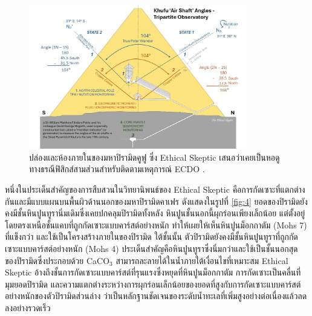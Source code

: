 \documentclass[10pt,twocolumn,letterpaper]{article}
\begin{document}
\begin{figure}[b]
\begin{center}
\includegraphics[width=0.85\textwidth]{shafts.jpg}
\end{center}
   \caption{ปล่องและห้องภายในของมหาปิรามิดคูฟู ซึ่ง Ethical Skeptic เสนอว่าเคยเป็นหอดูทางธรณีฟิสิกส์สามส่วนสำหรับติดตามเหตุการณ์ ECDO \cite{28}.}
\label{fig:5}
\end{figure}

หนึ่งในประเด็นสำคัญของการสืบสวนในวิทยานิพนธ์ของ Ethical Skeptic คือการกัดเซาะที่แตกต่างกันและมีแบบแผนบนพื้นผิวด้านนอกของมหาปิรามิดคาเฟร ดังแสดงในรูปที่ \ref{fig:4} ยอดของปิรามิดยังคงมีชั้นหินปูนทูรานิ่มเดิมซึ่งเคยปกคลุมปิรามิดทั้งหลัง หินปูนชั้นนอกนี้ผุกร่อนเพียงเล็กน้อย แต่ตั้งอยู่โดยตรงเหนือชั้นแคบที่ถูกกัดเซาะแบบคาร์สต์อย่างหนัก ทำให้เผยให้เห็นหินปูนม็อกกาตัม (Mohs 7) ที่แข็งกว่า และใช้เป็นโครงสร้างภายในของปิรามิด ใต้ชั้นนั้น ตัวปิรามิดยังคงมีชั้นหินปูนทูราที่ถูกกัดเซาะแบบคาร์สต์อย่างหนัก (Mohs 4) ประเด็นสำคัญคือหินปูนทูราซึ่งนิ่มกว่าและใช้เป็นชั้นนอกสุดของปิรามิดซึ่งประกอบด้วย CaCO$_3$ สามารถละลายได้ในน้ำภายใต้เงื่อนไขที่เหมาะสม Ethical Skeptic อ้างถึงชั้นการกัดเซาะแบบคาร์สต์ที่รุนแรงซึ่งหยุดที่หินปูนม็อกกาตัม การกัดเซาะเป็นคลื่นที่มุมยอดปิรามิด และความแตกต่างระหว่างการผุกร่อนเล็กน้อยของยอดที่สูงกับการกัดเซาะแบบคาร์สต์อย่างหนักของตัวปิรามิดส่วนล่าง ว่าเป็นหลักฐานชัดเจนของระดับน้ำทะเลที่เพิ่มสูงอย่างต่อเนื่องแล้วลดลงอย่างรวดเร็ว \cite{27}
\end{document}
